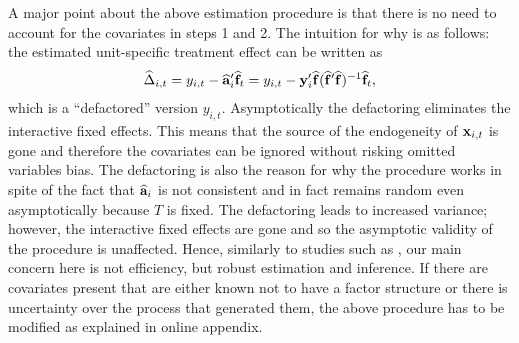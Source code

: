 \documentclass[12pt,fleqn]{article}
\begin{document}
  A major point about the above estimation procedure is that there is no need to account for the covariates in steps 1 and 2. The intuition for why is as follows: the estimated unit-specific treatment effect can be written as
  \begin{align}
  \widehat \Delta_{i,t} = y_{i,t} - \widehat{\mathbf{a}}_i'\widehat{\mathbf{f}}_t = y_{i,t} - \mathbf{y}_{i}'\widehat{\mathbf{f}}(\widehat{\mathbf{f}}'\widehat{\mathbf{f}})^{-1}\widehat{\mathbf{f}}_t,
  \end{align}
  which is a ``defactored'' version $y_{i,t}$. Asymptotically the defactoring eliminates the interactive fixed effects. This means that the source of the endogeneity of $\mathbf{x}_{i,t}$ is gone and therefore the covariates can be ignored without risking omitted variables bias. The defactoring is also the reason for why the procedure works in spite of the fact that $\widehat{\mathbf{a}}_i$ is not consistent and in fact remains random even asymptotically because $T$ is fixed. The defactoring leads to increased variance; however, the interactive fixed effects are gone and so the asymptotic validity of the procedure is unaffected. Hence, similarly to studies such as \citet{SantAnna_Zhao2020}, our main concern here is not efficiency, but robust estimation and inference. If there are covariates present that are either known not to have a factor structure or there is uncertainty over the process that generated them, the above procedure has to be modified as explained in online appendix.
  
\end{document}
